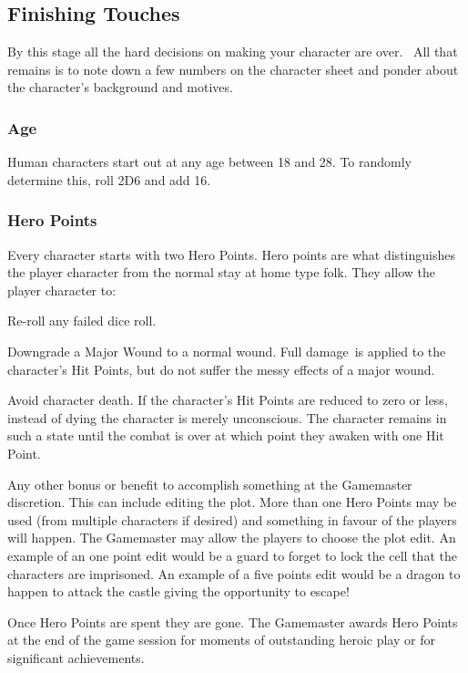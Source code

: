 \subsection{Finishing Touches}
By this stage all the hard decisions on making your character are over.  All that remains is to note down a few numbers on the character sheet and ponder about the character’s background and motives.

\subsubsection{Age}
Human characters start out at any age between 18 and 28. To randomly determine this, roll 2D6 and add 16. 

\subsubsection{Hero Points}
Every character starts with two Hero Points. Hero points are what distinguishes the player character from the normal stay at home type folk. They allow the player character to:

\begin{rpg-list}
	\item Re-roll any failed dice roll.
	\item Downgrade a Major Wound to a normal wound. Full damage is applied to the character's Hit Points, but do not suffer the messy effects of a major wound.
	\item Avoid character death. If the character’s Hit Points are reduced to zero or less, instead of dying the character is merely unconscious. The character remains in such a state until the combat is over at which point they awaken with one Hit Point.
	\item Any other bonus or benefit to accomplish something at the Gamemaster discretion. This can include editing the plot. More than one Hero Points may be used (from multiple characters if desired) and something in favour of the players will happen. The Gamemaster may allow the players to choose the plot edit. An example of an one point edit would be a guard to forget to lock the cell that the characters are imprisoned. An example of a five points edit would be a dragon to happen to attack the castle giving the opportunity to escape!
\end{rpg-list}

Once Hero Points are spent they are gone. The Gamemaster awards Hero Points at the end of the game session for moments of outstanding heroic play or for significant achievements.

